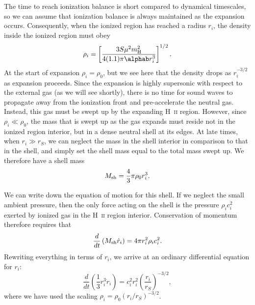 The time to reach ionization balance is short compared to dynamical timescales, so we can assume that ionization balance is always maintained as the expansion occurs. Consequently, when the ionized region has reached a radius $r_i$, the density inside the ionized region must obey
\begin{equation}
\rho_i = \left[\frac{3 S \mu^2 m_{\rm H}^2}{4(1.1)\pi \alphab r_i^3}\right]^{1/2}.
\end{equation}
At the start of expansion $\rho_i = \rho_0$, but we see here that the density drops as $r_i^{-3/2}$ as expansion proceeds. Since the expansion is highly supersonic with respect to the external gas (as we will see shortly), there is no time for sound waves to propagate away from the ionization front and pre-accelerate the neutral gas. Instead, this gas must be swept up by the expanding H~\textsc{ii} region. However, since $\rho_i \ll \rho_0$, the mass that is swept up as the gas expands must reside not in the ionized region interior, but in a dense neutral shell at its edges. At late times, when $r_i \gg r_S$, we can neglect the mass in the shell interior in comparison to that in the shell, and simply set the shell mass equal to the total mass swept up. We therefore have a shell mass
\begin{equation}
M_{\rm sh} = \frac{4}{3} \pi \rho_0 r_i^3.
\end{equation}

We can write down the equation of motion for this shell. If we neglect the small ambient pressure, then the only force acting on the shell is the pressure $\rho_i c_i^2$ exerted by ionized gas in the H~\textsc{ii} region interior. Conservation of momentum therefore requires that
\begin{equation}
\frac{d}{dt} \left(M_{\rm sh} \dot{r}_i\right) = 4\pi r_i^2 \rho_i c_i^2.
\end{equation}
Rewriting everything in terms of $r_i$, we arrive at an ordinary differential equation for $r_i$:
\begin{equation}
\frac{d}{dt} \left(\frac{1}{3} r_i^3 \dot{r}_i\right) = c_i^2 r_i^2 \left(\frac{r_i}{r_S}\right)^{-3/2},
\end{equation}
where we have used the scaling $\rho_i = \rho_0 (r_i/r_S)^{-3/2}$.

